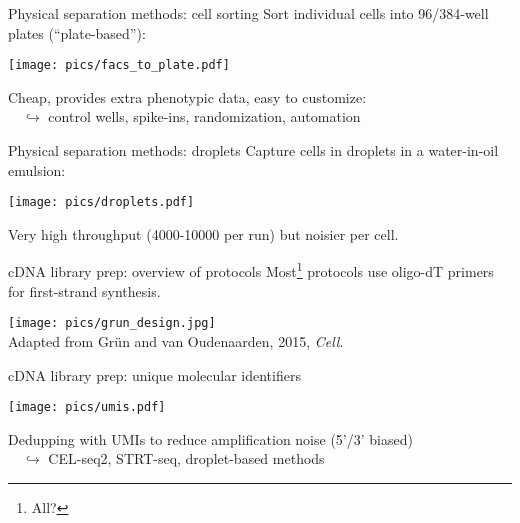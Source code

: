 \documentclass{beamer}
\begin{document}
\begin{frame}{Physical separation methods: cell sorting}
Sort individual cells into 96/384-well plates (``plate-based''):

\begin{center}
\texttt{[image: pics/facs\_to\_plate.pdf]}
\end{center}

Cheap, provides extra phenotypic data, easy to customize:\\
$\quad\hookrightarrow$ control wells, spike-ins, randomization, automation
\end{frame}

\begin{frame}{Physical separation methods: droplets}
Capture cells in droplets in a water-in-oil emulsion:

\begin{center}
\texttt{[image: pics/droplets.pdf]}
\end{center}

Very high throughput (4000-10000 per run) but noisier per cell.
\end{frame}

\begin{frame}{cDNA library prep: overview of protocols}
Most\footnote{All?} protocols use oligo-dT primers for first-strand synthesis.
\begin{center}
\texttt{[image: pics/grun\_design.jpg]} \\
{\tiny Adapted from Gr\"un and van Oudenaarden, 2015, \emph{Cell}.}
\end{center}
\end{frame}

\begin{frame}{cDNA library prep: unique molecular identifiers}
\begin{center}
\texttt{[image: pics/umis.pdf]}
\end{center}

Dedupping with UMIs to reduce amplification noise (5'/3' biased)\\
$\quad\hookrightarrow$ CEL-seq2, STRT-seq, droplet-based methods
\end{frame}
\end{document}

